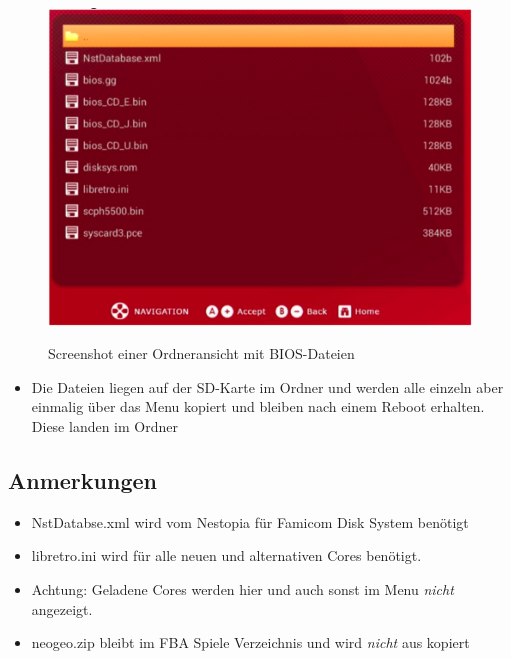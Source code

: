 \documentclass[a4paper]{article}
\begin{document}
\begin{figure}[h]
\caption{Screenshot einer Ordneransicht mit BIOS-Dateien}
\includegraphics[width=\textwidth]{needed-files-for-alternate-cores}
\label{fig:needed-files-for-alternate-cores}
\end{figure}

\begin{itemize}
  \item Die Dateien liegen auf der SD-Karte im  Ordner und werden alle einzeln aber einmalig \"uber das Menu kopiert und bleiben nach einem Reboot erhalten. Diese landen im Ordner 
\end{itemize}

\subsection{Anmerkungen}

\begin{itemize}
  \item NstDatabse.xml wird vom Nestopia f\"ur Famicom Disk System ben\"otigt
  \item libretro.ini wird f\"ur alle neuen und alternativen Cores ben\"otigt.
  \item Achtung: Geladene Cores werden hier und auch sonst im Menu \emph{nicht} angezeigt.
  \item neogeo.zip bleibt im FBA Spiele Verzeichnis und wird \emph{nicht} aus  kopiert
\end{itemize}
\end{document}
